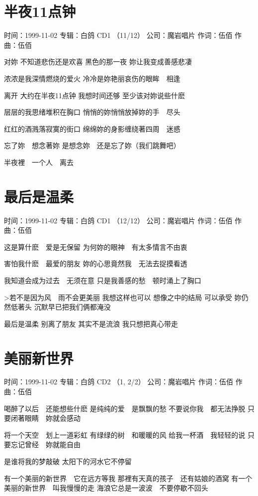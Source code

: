 \documentclass[UTF8,a4paper,oneside,twocolumn,12pt]{ctexbook}
\newcommand{\infopair}[2]{\textbullet #1：#2}
\newcommand{\zc}[1][伍佰]{\infopair{作词}{#1}}
\newcommand{\zq}[1][伍佰]{\infopair{作曲}{#1}}
\newcommand{\zj}[1]{\infopair{专辑}{#1}}
\newcommand{\sj}[1]{\infopair{时间}{#1}}
\newcommand{\gs}[1]{\infopair{公司}{#1}}
\newenvironment{info}{\begin{flushleft}\kaishu
	}
	{\end{flushleft}\normalsize\yahei\par}
\newenvironment{lyric}{
	}
{}
\begin{document}
\section{半夜11点钟}
\begin{info}
	\sj{1999-11-02}
	\zj{白鸽 CD1 （11/12）}
	\gs{魔岩唱片}
	\zc
	\zq
\end{info}
\begin{lyric}
	对妳
	不知道悲伤还是欢喜
	黑色的那一夜
	妳让我变成善感悲凄

	浓浓是我深情燃烧的爱火
	冷冷是妳艳丽哀伤的眼眸　相逢

	离开
	大约在半夜11点钟
	我想时间还够
	至少该对妳说些什麽

	层层的我思绪堆积在胸口
	悄悄的妳悄悄放掉妳的手　尽头

	红红的酒溅落寂寞的街口
	绵绵妳的身影缠绕著四周　迷惑

	忘了妳　想念著妳
	是想念妳　还是忘了妳（我们跳舞吧）

	半夜裡　一个人　离去
\end{lyric}

\section{最后是温柔}
\begin{info}
	\sj{1999-11-02}
	\zj{白鸽 CD1 （12/12）}
	\gs{魔岩唱片}
	\zc
	\zq
\end{info}
\begin{lyric}
	这是算什麽　爱是无保留
	为何妳的眼神　有太多情言不由衷

	害怕我什麽　最爱的朋友
	妳的心思竟然我　无法去捉摸看透

	我知道会成为过去　无须在意
	只是我善感的愁　顿时涌上了胸口

	>若不是因为风　雨不会更美丽
	我想这样也可以
	想像之中的结局
	可以承受
	妳仍然低著头
	沉默早已把我们俩都淹没

	最后是温柔
	别离了朋友
	其实不是流浪
	我只想把真心带走
\end{lyric}

\section{美丽新世界}
\begin{info}
	\sj{1999-11-02}
	\zj{白鸽 CD2 （1, 2/2）}
	\gs{魔岩唱片}
	\zc
	\zq
\end{info}
\begin{lyric}
	喝醉了以后　还能想些什麽
	是纯纯的爱　是飘飘的愁
	不要说你我　都无法挣脱
	只要闭著眼睛　妳就会感动

	将一个天空　划上一道彩虹
	有绿绿的树　和暖暖的风
	给我一杯酒　我轻轻的说
	只要忘记曾经　妳就能自由

	是谁将我的梦敲破
	太阳下的河水它不停留

	有一个美丽的新世界　它在远方等我
	那裡有天真的孩子　还有姑娘的酒窝
	有一个美丽的新世界　叫我慢慢的走
	海浪它总是一波波　不要停歇不回头
\end{lyric}
\end{document}
